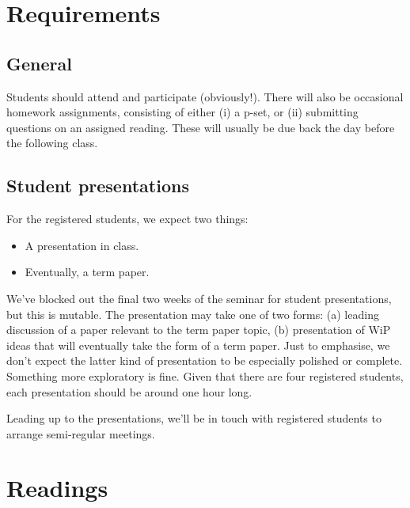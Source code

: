 \documentclass[nols,twoside,nofonts,nobib,nohyper]{tufte-handout}
\begin{document}
\section{Requirements}

\subsection{General}

Students should attend and participate (obviously!). There will also
be occasional homework assignments, consisting of either (i) a p-set, or (ii)
submitting questions on an assigned reading. These will usually be due back the
day before the following class.

\subsection{Student presentations}

For the registered students, we expect two things:

\begin{itemize}

  \item A presentation in class.

  \item Eventually, a term paper.

\end{itemize}

We've blocked out the final two weeks of the seminar for student presentations,
but this is mutable. The presentation may take one of two forms: (a)
leading discussion of a paper relevant to the term paper topic, (b)
presentation of WiP ideas that will eventually take the form of a term paper.
Just to emphasise, we don't expect the latter kind of presentation to be
especially polished or complete. Something more exploratory is fine. Given that
there are four registered students, each presentation should be around one hour
long.

Leading up to the presentations, we'll be in touch with registered students to
arrange semi-regular meetings.

\section{Readings}
\end{document}
